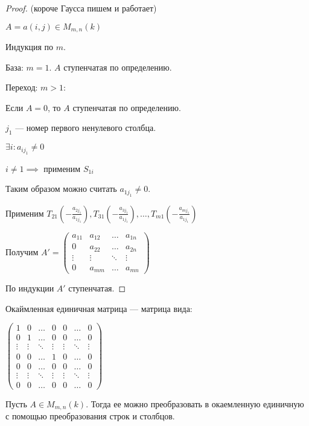 \begin{proof} (короче Гаусса пишем и работает)

    $A = a(i, j) \in M_{m, n}(k)$

    Индукция по $m$.

    База: $m = 1$. $A$ ступенчатая по определению.

    Переход: $m > 1$:

    Если $A = 0$, то $A$ ступенчатая по определению.

    $j_1$ --- номер первого ненулевого столбца. 

    $\exists i : a_{ij_1} \neq 0$

    $i \neq 1 \implies$ применим $S_{1i}$

    Таким образом можно считать $a_{1j_1} \neq 0$.

    Применим $T_{21} \left( -\frac{a_{2j_1}}{a_{1j_1}} \right), T_{31} \left( -\frac{a_{3j_1}}{a_{1j_1}} \right), \ldots, T_{m1} \left( -\frac{a_{mj_1}}{a_{1j_1}} \right)$

    Получим $A' = \begin{pmatrix} a_{11} & a_{12} & \ldots & a_{1n} \\ 0 & a_{22} & \ldots & a_{2n} \\ \vdots & \vdots & \ddots & \vdots \\ 0 & a_{mm} & \ldots & a_{mn} \end{pmatrix}$

    По индукции $A'$ ступенчатая.
\end{proof}

\begin{defn}
    Окаймленная единичная матрица --- матрица вида:

    $\begin{pmatrix}
        1 & 0 & \ldots & 0 & 0 & \ldots & 0 \\
        0 & 1 & \ldots & 0 & 0 & \ldots & 0 \\
        \vdots & \vdots & \ddots & \vdots & \vdots & \ddots & \vdots \\
        0 & 0 & \ldots & 1 & 0 & \ldots & 0 \\
        0 & 0 & \ldots & 0 & 0 & \ldots & 0 \\
        \vdots & \vdots & \ddots & \vdots & \vdots & \ddots & \vdots \\
        0 & 0 & \ldots & 0 & 0 & \ldots & 0
    \end{pmatrix}$
\end{defn}

\begin{theorem}
    Пусть $A \in M_{m, n}(k)$. Тогда ее можно преобразовать в окаемленную единичную с помощью преобразования строк и столбцов.
\end{theorem}

